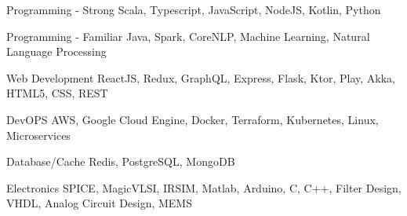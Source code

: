 

\begin{cvskills}

  \cvskill
    {Programming - Strong}
    {Scala, Typescript, JavaScript, NodeJS, Kotlin, Python}  
    
  \cvskill
    {Programming - Familiar}
    {Java, Spark, CoreNLP, Machine Learning, Natural Language Processing}  

  \cvskill
    {Web Development}
    {ReactJS, Redux, GraphQL, Express, Flask, Ktor, Play, Akka, HTML5, CSS, REST}   

  \cvskill
    {DevOPS}
    {AWS, Google Cloud Engine, Docker, Terraform, Kubernetes, Linux, Microservices}       

  \cvskill
    {Database/Cache}
    {Redis, PostgreSQL, MongoDB}         

  \cvskill
    {Electronics}
    {SPICE, MagicVLSI, IRSIM, Matlab, Arduino, C, C++, Filter Design, VHDL, Analog Circuit Design, MEMS}    

\end{cvskills}